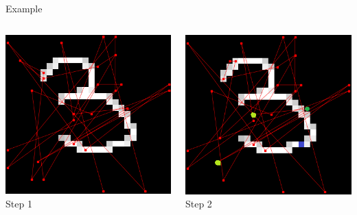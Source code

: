 \documentclass{beamer}
\begin{document}
        
	\begin{frame}{Example}
  
		\begin{columns}
    
			\begin{column}{0.33\textwidth}
      		
				\centering 
				\includegraphics[width=1\textwidth]{pics/algo_1_1.png}
Step 1
			\end{column}

    
			\begin{column}{0.33\textwidth}
      
				\centering
				\includegraphics[width=1\textwidth]{pics/algo_1_2.png}
Step 2
    			\end{column}



\end{columns}
\end{frame}
\end{document}
